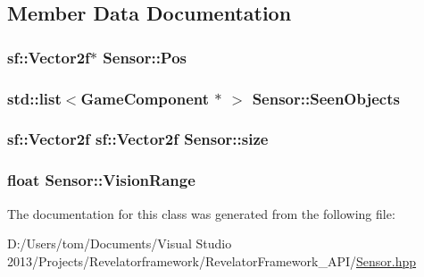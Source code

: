 \subsection{Member Data Documentation}
\hypertarget{class_sensor_ab3b919642b59b2245ad3cf56b042ff33}{
\subsubsection[{Pos}]{\setlength{\rightskip}{0pt plus 5cm}sf\-::\-Vector2f$\ast$ Sensor\-::\-Pos}}\label{class_sensor_ab3b919642b59b2245ad3cf56b042ff33}
\hypertarget{class_sensor_a3ed58c2bc9140a884ce86014fbfd6926}{
\subsubsection[{Seen\-Objects}]{\setlength{\rightskip}{0pt plus 5cm}std\-::list$<${\bf Game\-Component} $\ast$ $>$ Sensor\-::\-Seen\-Objects\hspace{0.3cm}{\ttfamily [private]}}}\label{class_sensor_a3ed58c2bc9140a884ce86014fbfd6926}
\hypertarget{class_sensor_ac3268b4c0c8cee967256a622dfc5517d}{
\subsubsection[{size}]{\setlength{\rightskip}{0pt plus 5cm}sf\-::\-Vector2f sf\-::\-Vector2f Sensor\-::size}}\label{class_sensor_ac3268b4c0c8cee967256a622dfc5517d}
\hypertarget{class_sensor_af509a7308626a219e017f07c0d25a78f}{
\subsubsection[{Vision\-Range}]{\setlength{\rightskip}{0pt plus 5cm}float Sensor\-::\-Vision\-Range\hspace{0.3cm}{\ttfamily [private]}}}\label{class_sensor_af509a7308626a219e017f07c0d25a78f}


The documentation for this class was generated from the following file\-:\begin{DoxyCompactItemize}
\item 
D\-:/\-Users/tom/\-Documents/\-Visual Studio 2013/\-Projects/\-Revelatorframework/\-Revelator\-Framework\-\_\-\-A\-P\-I/\hyperlink{_sensor_8hpp}{Sensor.\-hpp}\end{DoxyCompactItemize}
